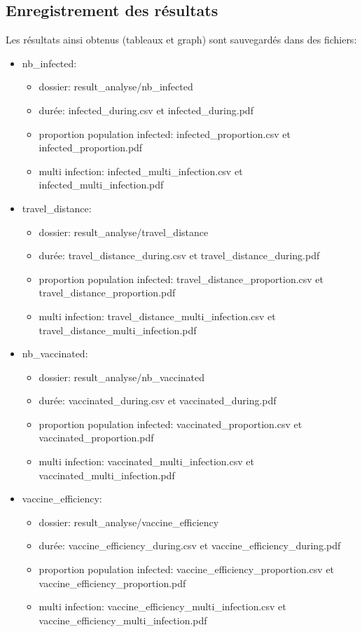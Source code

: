 \documentclass[a4paper, 11pt]{article}
\begin{document}
		\subsection{Enregistrement des résultats}
			
			Les résultats ainsi obtenus (tableaux et graph) sont sauvegardés dans des fichiers:
			\begin{itemize}
				\item nb\_infected:
				\begin{itemize}
					\item dossier: result\_analyse/nb\_infected
					\item durée: infected\_during.csv et infected\_during.pdf
					\item proportion population infected: infected\_proportion.csv et infected\_proportion.pdf
					\item multi infection: infected\_multi\_infection.csv et infected\_multi\_infection.pdf
				\end{itemize}
				
				\item travel\_distance:
				\begin{itemize}
					\item dossier: result\_analyse/travel\_distance
					\item durée: travel\_distance\_during.csv et travel\_distance\_during.pdf
					\item proportion population infected: travel\_distance\_proportion.csv et travel\_distance\_proportion.pdf
					\item multi infection: travel\_distance\_multi\_infection.csv et travel\_distance\_multi\_infection.pdf
				\end{itemize}
				
				\item nb\_vaccinated:
				\begin{itemize}
					\item dossier: result\_analyse/nb\_vaccinated
					\item durée: vaccinated\_during.csv et vaccinated\_during.pdf
					\item proportion population infected: vaccinated\_proportion.csv et vaccinated\_proportion.pdf
					\item multi infection: vaccinated\_multi\_infection.csv et vaccinated\_multi\_infection.pdf
				\end{itemize}
				
				\item vaccine\_efficiency:
				\begin{itemize}
					\item dossier: result\_analyse/vaccine\_efficiency
					\item durée: vaccine\_efficiency\_during.csv et vaccine\_efficiency\_during.pdf
					\item proportion population infected: vaccine\_efficiency\_proportion.csv et vaccine\_efficiency\_proportion.pdf
					\item multi infection: vaccine\_efficiency\_multi\_infection.csv et vaccine\_efficiency\_multi\_infection.pdf
				\end{itemize}
				

\end{itemize}
\end{document}
